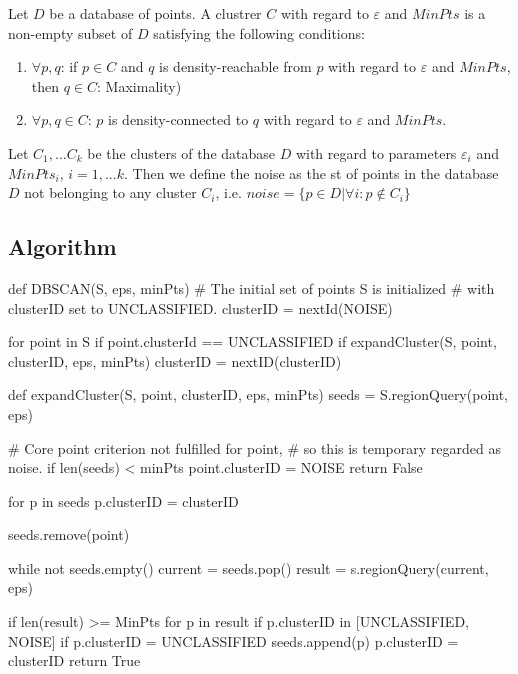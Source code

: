 \begin{definition}[Cluster]
\label{definition:dbscan-cluster}
    Let $D$ be a database of points. A clustrer $C$ with regard to
    $\varepsilon$ and $MinPts$ is a non-empty subset of $D$ satisfying
    the following conditions:
    \begin{enumerate}
        \item $\forall p, q$: if $p \in C$ and $q$ is density-reachable
        from $p$ with regard to $\varepsilon$ and $MinPts$, then
        $q \in C$: Maximality)
        \item $\forall p, q \in C$: $p$ is density-connected to $q$ 
        with regard to $\varepsilon$ and $MinPts$.
    \end{enumerate}
\end{definition}

\begin{definition}[Noise]
\label{definition:dbscan-noise}
    Let $C_1,...C_k$ be the clusters of the database $D$ with regard
    to parameters $\varepsilon_i$ and $MinPts_i$, $i=1,...k$. Then we
    define the noise as the st of points in the database $D$ not 
    belonging to any cluster $C_i$, i.e. 
    $noise = \{ p \in D | \forall i: p \not\in C_i \}$ 
\end{definition}

\newpage

\subsection{Algorithm}
\begin{python}
def DBSCAN(S, eps, minPts)
	# The initial set of points S is initialized  
	# with clusterID set to UNCLASSIFIED.
	clusterID = nextId(NOISE)
	
	for point in S
		if point.clusterId == UNCLASSIFIED
			if expandCluster(S, point, clusterID, eps, minPts)
				clusterID = nextID(clusterID)

def expandCluster(S, point, clusterID, eps, minPts)
	seeds = S.regionQuery(point, eps)
	
	# Core point criterion not fulfilled for point, 
	# so this is temporary regarded as noise.
	if len(seeds) < minPts
		point.clusterID = NOISE
		return False
	
	for p in seeds
	    p.clusterID = clusterID
	
	seeds.remove(point)
	
	while not seeds.empty()
		current = seeds.pop()
		result = s.regionQuery(current, eps)
	
		if len(result) >= MinPts
			for p in result
				if p.clusterID in [UNCLASSIFIED, NOISE]
					if p.clusterID = UNCLASSIFIED
						seeds.append(p)
					p.clusterID = clusterID
	return True
\end{python}